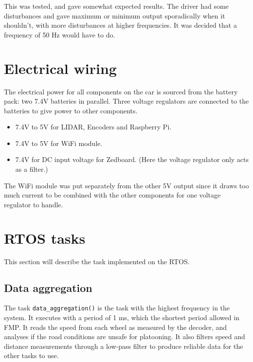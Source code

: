 This was tested, and gave somewhat expected results. The driver had some disturbances and gave maximum or minimum output sporadically when it shouldn't, with more disturbances at higher frequencies. It was decided that a frequency of 50 Hz would have to do.

\section{Electrical wiring}
The electrical power for all components on the car is sourced from the battery pack: two 7.4V batteries in parallel. Three voltage regulators are connected to the batteries to give power to other components. 

\begin{itemize}

\item 7.4V to 5V for LIDAR, Encoders and Raspberry Pi.

\item 7.4V to 5V for WiFi module.

\item 7.4V for DC input voltage for Zedboard. (Here the voltage regulator only acts as a filter.)

\end{itemize}

The WiFi module was put separately from the other 5V output since it draws too much current to be combined with the other components for one voltage regulator to handle. 

\section{RTOS tasks}
This section will describe the task implemented on the RTOS.

\subsection{Data aggregation}
The task \texttt{data\_aggregation()} is the task with the highest frequency in the system. It executes with a period of 1 ms, which the shortest period allowed in FMP. It reads the speed from each wheel as measured by the decoder, and analyses if the road conditions are unsafe for platooning. It also filters speed and distance measurements through a low-pass filter to produce reliable data for the other tasks to use.

